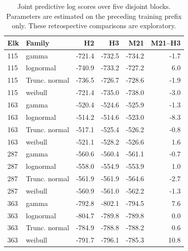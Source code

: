 \begin{table}[tbp]
\centering\small
\caption{Joint predictive log scores over five disjoint blocks. Parameters are estimated on the preceding training prefix only. These retrospective comparisons are exploratory.}
\label{tab:movement-validation}
\begin{tabular}{llrrrr}
\toprule
Elk & Family & H2 & H3 & M21 & M21--H3 \\
\midrule
115 & gamma & -721.4 & -732.5 & -734.2 & -1.7 \\
115 & lognormal & -740.9 & -733.2 & -727.2 & 6.0 \\
115 & Trunc. normal & -736.5 & -726.7 & -728.6 & -1.9 \\
115 & weibull & -721.4 & -735.0 & -738.0 & -3.0 \\
163 & gamma & -520.4 & -524.6 & -525.9 & -1.3 \\
163 & lognormal & -514.2 & -514.6 & -523.0 & -8.3 \\
163 & Trunc. normal & -517.1 & -525.4 & -526.2 & -0.8 \\
163 & weibull & -521.1 & -528.2 & -526.6 & 1.6 \\
287 & gamma & -560.6 & -560.4 & -561.1 & -0.7 \\
287 & lognormal & -558.0 & -554.9 & -553.9 & 1.0 \\
287 & Trunc. normal & -561.9 & -561.9 & -564.6 & -2.7 \\
287 & weibull & -560.9 & -561.0 & -562.2 & -1.3 \\
363 & gamma & -792.8 & -802.1 & -794.5 & 7.6 \\
363 & lognormal & -804.7 & -789.8 & -789.8 & 0.0 \\
363 & Trunc. normal & -784.9 & -788.8 & -788.2 & 0.6 \\
363 & weibull & -791.7 & -796.1 & -785.3 & 10.8 \\
\bottomrule
\end{tabular}
\end{table}
